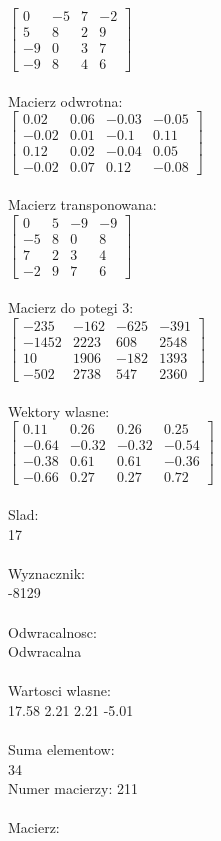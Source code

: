\documentclass[a4paper,12pt]{article}
\begin{document}
$\begin{bmatrix} 0&-5&7&-2\\5&8&2&9\\-9&0&3&7\\-9&8&4&6 \end{bmatrix}$
\\
\\
Macierz odwrotna:\\

$\begin{bmatrix} 0.02&0.06&-0.03&-0.05\\-0.02&0.01&-0.1&0.11\\0.12&0.02&-0.04&0.05\\-0.02&0.07&0.12&-0.08 \end{bmatrix}$
\\
\\
Macierz transponowana:\\

$\begin{bmatrix} 0&5&-9&-9\\-5&8&0&8\\7&2&3&4\\-2&9&7&6 \end{bmatrix}$
\\
\\
Macierz do potegi 3:\\

$\begin{bmatrix} -235&-162&-625&-391\\-1452&2223&608&2548\\10&1906&-182&1393\\-502&2738&547&2360 \end{bmatrix}$
\\
\\
Wektory wlasne:\\

$\begin{bmatrix} 0.11&0.26&0.26&0.25\\-0.64&-0.32&-0.32&-0.54\\-0.38&0.61&0.61&-0.36\\-0.66&0.27&0.27&0.72 \end{bmatrix}$
\\
\\
Slad:\\
17
\\
\\
Wyznacznik:\\
-8129
\\
\\
Odwracalnosc:\\
Odwracalna
\\
\\
Wartosci wlasne:\\
17.58 2.21 2.21 -5.01
\\
\\
Suma elementow:\\
34
\\
\newpage
Numer macierzy:
211
\\
\\
Macierz:\\
\end{document}
